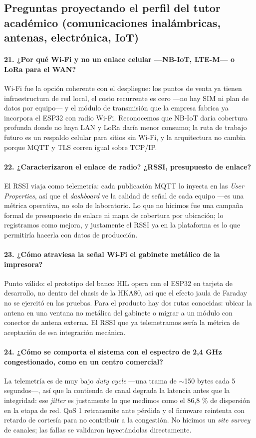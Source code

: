 \documentclass[11pt, a4paper]{article}
\begin{document}
\subsection*{Preguntas proyectando el perfil del tutor académico (comunicaciones inalámbricas, antenas, electrónica, IoT)}

\paragraph{21. ¿Por qué Wi-Fi y no un enlace celular —NB-IoT, LTE-M— o LoRa para el WAN?}
Wi-Fi fue la opción coherente con el despliegue: los puntos de venta ya tienen infraestructura de red local, el costo recurrente es cero —no hay SIM ni plan de datos por equipo— y el módulo de transmisión que la empresa fabrica ya incorpora el ESP32 con radio Wi-Fi. Reconocemos que NB-IoT daría cobertura profunda donde no haya LAN y LoRa daría menor consumo; la ruta de trabajo futuro es un respaldo celular para sitios sin Wi-Fi, y la arquitectura no cambia porque MQTT y TLS corren igual sobre TCP/IP.

\paragraph{22. ¿Caracterizaron el enlace de radio? ¿RSSI, presupuesto de enlace?}
El RSSI viaja como telemetría: cada publicación MQTT lo inyecta en las \textit{User Properties}, así que el \textit{dashboard} ve la calidad de señal de cada equipo —es una métrica operativa, no solo de laboratorio. Lo que no hicimos fue una campaña formal de presupuesto de enlace ni mapa de cobertura por ubicación; lo registramos como mejora, y justamente el RSSI ya en la plataforma es lo que permitiría hacerla con datos de producción.

\paragraph{23. ¿Cómo atraviesa la señal Wi-Fi el gabinete metálico de la impresora?}
Punto válido: el prototipo del banco HIL opera con el ESP32 en tarjeta de desarrollo, no dentro del chasis de la HKA80, así que el efecto jaula de Faraday no se ejercitó en las pruebas. Para el producto hay dos rutas conocidas: ubicar la antena en una ventana no metálica del gabinete o migrar a un módulo con conector de antena externa. El RSSI que ya telemetramos sería la métrica de aceptación de esa integración mecánica.

\paragraph{24. ¿Cómo se comporta el sistema con el espectro de 2,4 GHz congestionado, como en un centro comercial?}
La telemetría es de muy bajo \textit{duty cycle} —una trama de $\sim$150 bytes cada 5 segundos—, así que la contienda de canal degrada la latencia antes que la integridad: ese \textit{jitter} es justamente lo que medimos como el 86,8 \% de dispersión en la etapa de red. QoS 1 retransmite ante pérdida y el firmware reintenta con retardo de cortesía para no contribuir a la congestión. No hicimos un \textit{site survey} de canales; las fallas se validaron inyectándolas directamente.
\end{document}
